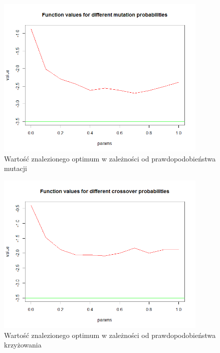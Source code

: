 \documentclass[11pt, a4paper]{article}
\begin{document}
\begin{figure}[H]
	\begin{center}
		\includegraphics[width=0.9\textwidth]{./assets/Zeldasine2.png} %
		\caption{Wartość znalezionego optimum w zależności od prawdopodobieństwa mutacji}
		\label{fig:gulf7}
	\end{center}
\end{figure}
\begin{figure}[H]
	\begin{center}
		\includegraphics[width=0.9\textwidth]{./assets/Zeldasine3.png} %
		\caption{Wartość znalezionego optimum w zależności od prawdopodobieństwa krzyżowania}
		\label{fig:gulf7}
	\end{center}
\end{figure}
\end{document}
